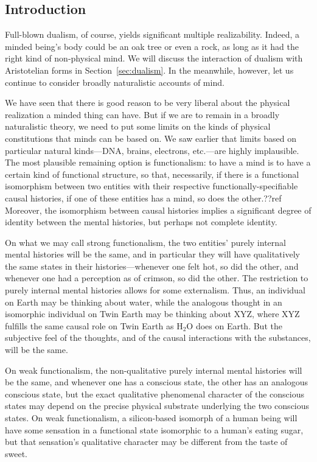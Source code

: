 \subsection{Introduction}
Full-blown dualism, of course, yields significant multiple realizability. Indeed, a minded being's body could be an oak tree or even a 
rock, as long as it had the right kind of non-physical mind. We will discuss the interaction of dualism with Aristotelian
forms in Section~\ref{sec:dualism}. In the meanwhile, however, let us continue to consider broadly naturalistic accounts of mind.

We have seen that there is good reason to be very liberal about the physical realization a minded thing can have.  But 
if we are to remain in a broadly naturalistic theory, we need to put some limits on the kinds of physical constitutions that
minds can be based on. We saw earlier that limits based on particular natural kinds---DNA, brains, electrons, etc.---are highly
implausible. The most plausible remaining option is functionalism: to have a mind is to have a certain kind of functional structure,
so that, necessarily, if there is a functional isomorphism between two entities with their respective functionally-specifiable 
causal histories, if one of these entities has a mind, so does the other.??ref Moreover, the isomorphism between causal histories implies
a significant degree of identity between the mental histories, but perhaps not complete identity.

On what we may call strong functionalism, the two entities' purely internal mental histories
will be the same, and in particular they will have qualitatively the same states in their histories---whenever one felt hot, so did
the other, and whenever one had a perception as of crimson, so did the other. The restriction to purely internal mental histories allows
for some externalism. Thus, an individual on Earth may be thinking about water, while the analogous thought in an isomorphic individual
on Twin Earth may be thinking about XYZ, where XYZ fulfills the same causal role on Twin Earth as H$_2$O does on Earth. 
But the subjective feel of the thoughts, and of the causal interactions with the substances, will be the same.

On weak functionalism, the non-qualitative purely internal mental histories will be the same, and whenever one has a conscious state, 
the other has an analogous conscious state, but the exact qualitative phenomenal character of the conscious states may depend on 
the precise physical substrate underlying the two conscious states. On weak functionalism, a silicon-based isomorph of a human being
will have some sensation in a functional state isomorphic to a human's eating sugar, but that sensation's qualitative character may
be different from the taste of sweet. 

